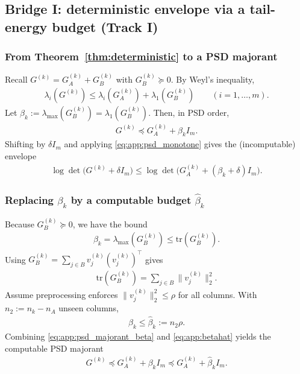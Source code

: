\documentclass{article}
\theoremstyle{plain}
\theoremstyle{definition}
\theoremstyle{remark}
\begin{document}
\subsection{Bridge I: deterministic envelope via a tail-energy budget (Track I)}
\label{app:sigmaub:bridgeI}

\subsubsection{From Theorem~\ref{thm:deterministic} to a PSD majorant}
Recall $G^{(k)}=G_A^{(k)}+G_B^{(k)}$ with $G_B^{(k)}\succeq 0$. By Weyl's inequality,
\begin{align}
\lambda_i\!\left(G^{(k)}\right)\le \lambda_i\!\left(G_A^{(k)}\right)+\lambda_1\!\left(G_B^{(k)}\right)
\qquad (i=1,\dots,m).
\end{align}
Let $\beta_k:=\lambda_{\max}(G_B^{(k)})=\lambda_1(G_B^{(k)})$. Then, in PSD order,
\begin{align}
G^{(k)} \preceq G_A^{(k)}+\beta_k I_m.
\label{eq:app:psd_majorant_beta}
\end{align}
Shifting by $\delta I_m$ and applying \eqref{eq:app:psd_monotone} gives the (incomputable) envelope
\begin{align}
\log\det\!\big(G^{(k)}+\delta I_m\big)
\le
\log\det\!\big(G_A^{(k)}+(\beta_k+\delta)I_m\big).
\label{eq:app:kf_envelope_beta}
\end{align}

\subsubsection{Replacing $\beta_k$ by a computable budget $\widehat{\beta}_k$}
Because $G_B^{(k)}\succeq 0$, we have the bound
\begin{align}
\beta_k=\lambda_{\max}(G_B^{(k)}) \le \mathrm{tr}(G_B^{(k)}).
\label{eq:app:beta_le_trace}
\end{align}
Using $G_B^{(k)}=\sum_{j\in B} v_j^{(k)}(v_j^{(k)})^\top$ gives
\begin{align}
\mathrm{tr}(G_B^{(k)})=\sum_{j\in B}\|v_j^{(k)}\|_2^2.
\label{eq:app:trace_sum_norms}
\end{align}
Assume preprocessing enforces $\|v_j^{(k)}\|_2^2\le \rho$ for all columns.
With $n_2:=n_k-n_A$ unseen columns,
\begin{align}
\beta_k \le \widehat{\beta}_k := n_2\rho .
\label{eq:app:betahat}
\end{align}
Combining \eqref{eq:app:psd_majorant_beta} and \eqref{eq:app:betahat} yields the computable PSD majorant
\begin{align}
G^{(k)} \preceq G_A^{(k)}+\beta_k I_m \preceq G_A^{(k)}+\widehat{\beta}_k I_m .
\label{eq:app:psd_majorant_hat}
\end{align}
\end{document}
